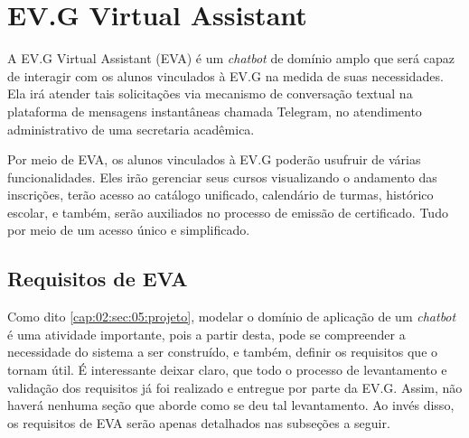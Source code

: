 %
%
%
%

\chapter{EV.G Virtual Assistant}

A EV.G Virtual Assistant (EVA) é um \textit{chatbot} de domínio amplo que será capaz de interagir com os alunos vinculados à EV.G na medida de suas necessidades.
Ela irá atender tais solicitações via mecanismo de conversação textual na plataforma de mensagens instantâneas chamada Telegram, no atendimento administrativo de uma secretaria acadêmica.

Por meio de EVA, os alunos vinculados à EV.G poderão usufruir de várias funcionalidades.
Eles irão gerenciar seus cursos visualizando o andamento das inscrições, 
terão acesso ao catálogo unificado, calendário de turmas, histórico escolar, 
e também, serão auxiliados no processo de emissão de certificado. 
Tudo por meio de um acesso único e simplificado.

\section{Requisitos de EVA}\label{especificacao-requisitos-eva}

Como dito \ref{cap:02:sec:05:projeto}, modelar o domínio de aplicação de um \textit{chatbot} é uma atividade importante, pois a partir desta, pode se compreender a necessidade do sistema a ser construído, e também, definir os requisitos que o tornam útil.
É interessante deixar claro, que todo o processo de levantamento e validação dos requisitos já foi realizado e entregue por parte da EV.G. 
Assim, não haverá nenhuma seção que aborde como se deu tal levantamento. 
Ao invés disso, os requisitos de EVA serão apenas detalhados nas subseções a seguir.

